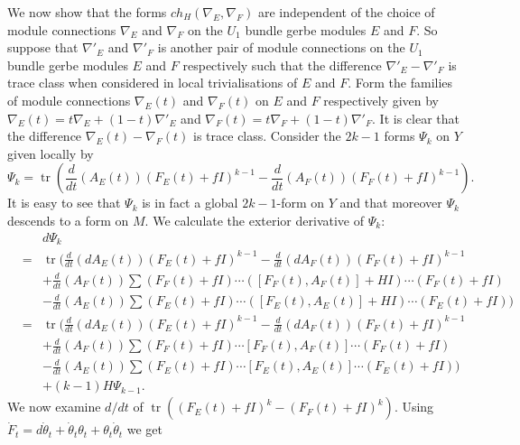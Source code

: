 \documentclass[a4paper,reqno]{amsart}
\DeclareMathOperator{\tr}{tr}
\theoremstyle{plain}
\theoremstyle{definition}
\theoremstyle{remark}
\numberwithin{equation}{section}
\numberwithin{figure}{section}
\newcommand{\<}{\langle}
\renewcommand{\>}{\rangle}
\begin{document}
We now show that the forms $ch_H(\nabla_E,\nabla_F)$ are independent of 
the choice of module connections $\nabla_E$ 
and $\nabla_F$ on the $U_1$ bundle gerbe modules $E$ and $F$.   
So suppose that  
$\nabla'_E$ and $\nabla'_F$ is another pair of module 
connections on the $U_1$ bundle gerbe modules $E$ and 
$F$ respectively such that the difference $\nabla'_E - 
\nabla'_F$ is trace class when considered in local trivialisations 
of $E$ and $F$.   
Form the families of module connections $\nabla_E(t)$ and 
$\nabla_F(t)$ on $E$ and $F$ respectively given 
by $\nabla_E(t) = t\nabla_E + (1-t)\nabla'_E$ 
and $\nabla_F(t) = t\nabla_F +(1-t)\nabla'_F$.  It is 
clear that the difference $\nabla_E(t) - \nabla_F(t)$ 
is trace class.   
Consider the $2k-1$ forms $\Psi_k$ on $Y$ given locally by 
\begin{equation} 
\Psi_k = \tr (\frac{d}{dt}(A_E(t))(F_E(t) 
+fI)^{k-1} - \frac{d}{dt}(A_F(t))(F_F(t) 
+fI)^{k-1}). 
\end{equation} 
It is easy to see that $\Psi_k$ is in fact a global 
$2k-1$-form on $Y$ and that moreover 
$\Psi_k$ descends to a form on $M$.  We 
calculate the exterior derivative of $\Psi_k$: 
\begin{eqnarray*} 
&   & d\Psi_k                        \\ 
& = & \tr(\frac{d}{dt}(dA_E(t))(F_E(t)  
+ fI)^{k-1} - \frac{d}{dt}(dA_F(t))(F_F(t) + fI)^{k-1} \\ 
&   & +\frac{d}{dt}(A_F(t))\sum (F_F(t) 
+ fI)\cdots ([F_F(t),A_F(t)] + HI)\cdots 
(F_F(t) + fI)                                      \\ 
&   & -\frac{d}{dt}(A_E(t))\sum (F_E(t) 
+ fI)\cdots ([F_E(t),A_E(t)] + HI) 
\cdots (F_E(t) + fI))                                \\ 
& = & \tr(\frac{d}{dt}(dA_E(t))(F_E(t) 
+ fI)^{k-1} - \frac{d}{dt}(dA_F(t))(F_F(t) 
+ fI)^{k-1}                                                   \\ 
&   & +\frac{d}{dt}(A_F(t))\sum (F_F(t) + fI) 
\cdots [F_F(t),A_F(t)]\cdots (F_F(t) + fI) \\ 
&   & - \frac{d}{dt}(A_E(t))\sum (F_E(t) 
+ fI)\cdots [F_E(t),A_E(t)]\cdots 
(F_E(t) + fI))                                    \\ 
&    & + (k-1)H\Psi_{k-1}.  
\end{eqnarray*} 
We now examine $d/dt$ of $\tr((F_E(t) + fI)^k 
- (F_F(t) + fI)^k)$.  Using $\dot{F}_t = d\dot{\theta}_t 
+ \dot{\theta}_t\theta_t + \theta_t\dot{\theta}_t$ we get 
\end{document}
